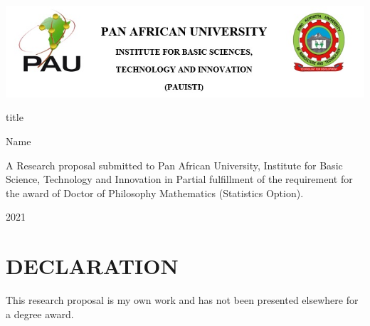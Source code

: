 \documentclass[12pt]{report}
\title{}
\author{}
\numberwithin{equation}{section}
\begin{document}
	\begin{titlepage}
		\includegraphics[scale=0.7]{logo.jpg}
		\begin{center}
			
		\end{center}
		\begin{center}
			{\large title\par} 
			\vspace{5cm}
			\begin{center}
				{\large Name}
				\par\end{center}{\large \par}
		\end{center}
		\par	
		\begin{center}
			\vspace{2cm}
			\par\end{center}	
		
		\begin{center}A Research proposal submitted to Pan African University, Institute for Basic Science, Technology and Innovation in Partial fulfillment of the requirement for the award of Doctor of Philosophy Mathematics (Statistics Option).%
		\end{center}	
		\vspace{1.5cm}
		\begin{center}
			2021
			\end {center}
		\end{titlepage}
		\begin{center}
			\noindent{}
		\end{center}
		\section*{\hspace{5cm}DECLARATION} 
		\noindent This research proposal is my own work and has not been presented
		elsewhere for a degree award. 
		
\end{document}

